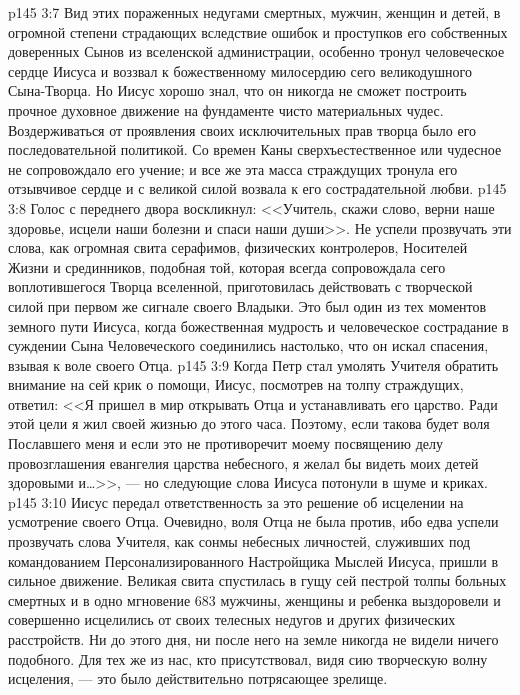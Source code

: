 \vs p145 3:7 Вид этих пораженных недугами смертных, мужчин, женщин и детей, в огромной степени страдающих вследствие ошибок и проступков его собственных доверенных Сынов из вселенской администрации, особенно тронул человеческое сердце Иисуса и воззвал к божественному милосердию сего великодушного Сына\hyp{}Творца. Но Иисус хорошо знал, что он никогда не сможет построить прочное духовное движение на фундаменте чисто материальных чудес. Воздерживаться от проявления своих исключительных прав творца было его последовательной политикой. Со времен Каны сверхъестественное или чудесное не сопровождало его учение; и все же эта масса страждущих тронула его отзывчивое сердце и с великой силой возвала к его сострадательной любви.
\vs p145 3:8 Голос с переднего двора воскликнул: <<Учитель, скажи слово, верни наше здоровье, исцели наши болезни и спаси наши души>>. Не успели прозвучать эти слова, как огромная свита серафимов, физических контролеров, Носителей Жизни и срединников, подобная той, которая всегда сопровождала сего воплотившегося Творца вселенной, приготовилась действовать с творческой силой при первом же сигнале своего Владыки. Это был один из тех моментов земного пути Иисуса, когда божественная мудрость и человеческое сострадание в суждении Сына Человеческого соединились настолько, что он искал спасения, взывая к воле своего Отца.
\vs p145 3:9 Когда Петр стал умолять Учителя обратить внимание на сей крик о помощи, Иисус, посмотрев на толпу страждущих, ответил: <<Я пришел в мир открывать Отца и устанавливать его царство. Ради этой цели я жил своей жизнью до этого часа. Поэтому, если такова будет воля Пославшего меня и если это не противоречит моему посвящению делу провозглашения евангелия царства небесного, я желал бы видеть моих детей здоровыми и\ldots >>, --- но следующие слова Иисуса потонули в шуме и криках.
\vs p145 3:10 Иисус передал ответственность за это решение об исцелении на усмотрение своего Отца. Очевидно, воля Отца не была против, ибо едва успели прозвучать слова Учителя, как сонмы небесных личностей, служивших под командованием Персонализированного Настройщика Мыслей Иисуса, пришли в сильное движение. Великая свита спустилась в гущу сей пестрой толпы больных смертных и в одно мгновение 683 мужчины, женщины и ребенка выздоровели и совершенно исцелились от своих телесных недугов и других физических расстройств. Ни до этого дня, ни после него на земле никогда не видели ничего подобного. Для тех же из нас, кто присутствовал, видя сию творческую волну исцеления, --- это было действительно потрясающее зрелище.
